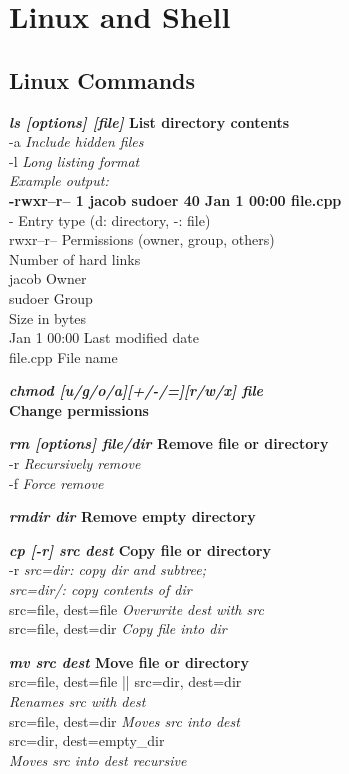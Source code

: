\section{Linux and Shell}

\subsection*{Linux Commands}

\textbf{\emph{ls [options] [file]} \hfill List directory contents}\\
\quad -a \hfill \textit{Include hidden files}\\
\quad -l \hfill \textit{Long listing format}\\
\textit{Example output:}\\
\quad \textbf{-rwxr--r-- 1 jacob sudoer 40 Jan 1 00:00 file.cpp}\\
\qquad - \hfill Entry type (d: directory, -: file)\\
\qquad rwxr--r-- \hfill Permissions (owner, group, others)\\
 \hfill Number of hard links\\
\qquad jacob \hfill Owner\\
\qquad sudoer \hfill Group\\
 \hfill Size in bytes\\
\qquad Jan 1 00:00 \hfill Last modified date\\
\qquad file.cpp \hfill File name

\textbf{\emph{chmod [u/g/o/a][+/-/=][r/w/x] file} \\\hfill Change permissions}

\textbf{\emph{rm [options] file/dir} \hfill Remove file or directory}\\
\quad -r \hfill \textit{Recursively remove}\\
\quad -f \hfill \textit{Force remove}

\textbf{\emph{rmdir dir} \hfill Remove empty directory}

\textbf{\emph{cp [-r] src dest} \hfill Copy file or directory}\\
\quad -r \hfill \textit{src=dir: copy dir and subtree;\\
\hfill src=dir/: copy contents of dir}\\
\quad src=file, dest=file \hfill \textit{Overwrite dest with src}\\
\quad src=file, dest=dir \hfill \textit{Copy file into dir}

\textbf{\emph{mv src dest} \hfill Move file or directory}\\
\quad src=file, dest=file || src=dir, dest=dir \\
\quad \hfill \textit{Renames src with dest}\\
\quad src=file, dest=dir \hfill \textit{Moves src into dest}\\
\quad src=dir, dest=empty\_dir \\
\quad \hfill \textit{Moves src into dest recursive}\\

